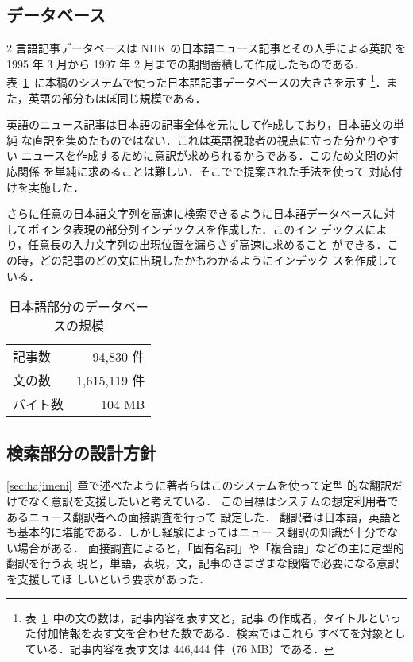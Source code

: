 \subsection{データベース}
\label{sec:database}
\vspace{-1mm}
2 言語記事データベースは NHK の日本語ニュース記事とその人手による英訳
を 1995 年 3 月から 1997 年 2 月までの期間蓄積して作成したものである．
表~\ref{tab:database}~に本稿のシステムで使った日本語記事データベースの大きさを示す
\footnote{表~\ref{tab:database}~中の文の数は，記事内容を表す文と，記事
の作成者，タイトルといった付加情報を表す文を合わせた数である．検索ではこれら
すべてを対象としている．記事内容を表す文は 446,444 件（76 MB）である．
}．また，英語の部分もほぼ同じ規模である．

英語のニュース記事は日本語の記事全体を元にして作成しており，日本語文の単純
な直訳を集めたものではない．これは英語視聴者の視点に立った分かりやすい
ニュースを作成するために意訳が求められるからである．このため文間の対応関係
を単純に求めることは難しい．そこで\cite{Kuma97}で提案された手法を使って
対応付けを実施した．

さらに任意の日本語文字列を高速に検索できるように日本語データベースに対
してポインタ表現の部分列インデックスを作成した\cite{Naga96}．このイン
デックスにより，任意長の入力文字列の出現位置を漏らさず高速に求めること
ができる．この時，どの記事のどの文に出現したかもわかるようにインデック
スを作成している．

\begin{table}
 \begin{center}
  \caption{日本語部分のデータベースの規模}
  \begin{tabular}{l|r}\hline\hline
   記事数 & 94,830 件\\
   文の数 & 1,615,119 件\\
   バイト数 & 104 MB\\\hline
  \end{tabular}
  \label{tab:database}
 \end{center}
\end{table}

\subsection{検索部分の設計方針}
\label{sec:houshin}
\ref{sec:hajimeni}~章で述べたように著者らはこのシステムを使って定型
的な翻訳だけでなく意訳を支援したいと考えている．
この目標はシステムの想定利用者であるニュース翻訳者への面接調査を行って
設定した．
翻訳者は日本語，英語とも基本的に堪能である．しかし経験によってはニュー
ス翻訳の知識が十分でない場合がある．
面接調査によると，「固有名詞」や「複合語」などの主に定型的翻訳を行う表
現と，単語，表現，文，記事のさまざまな段階で必要になる意訳を支援してほ
しいという要求があった．

